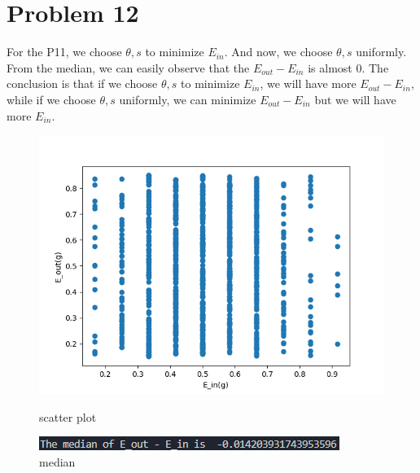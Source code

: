 \documentclass[12pt,a4paper]{article}
\begin{document}
\section*{Problem 12}    
For the P11, we choose $\theta, s$ to minimize $E_{in}$. And now, we choose $\theta, s$ uniformly.
From the median, we can easily observe that the $E_{out}-E_{in}$ is almost 0.
The conclusion is that if we choose $\theta, s$ to minimize $E_{in}$, we will have more $E_{out}-E_{in}$,
while if we choose $\theta, s$ uniformly, we can minimize $E_{out}-E_{in}$ but we will have more $E_{in}$.
\begin{figure}[hbp]
    \centering
    \begin{minipage}{0.48\linewidth}
        \centering
        \includegraphics[width = \linewidth]{Hw2P12.png}
        \caption{scatter plot}
    \end{minipage}\hfil
    \begin{minipage}{0.48\linewidth}
        \centering
        \includegraphics[width = \linewidth]{Hw2P12 median.png}
        \caption{median}
    \end{minipage}\hfil
\end{figure}
\end{document}

